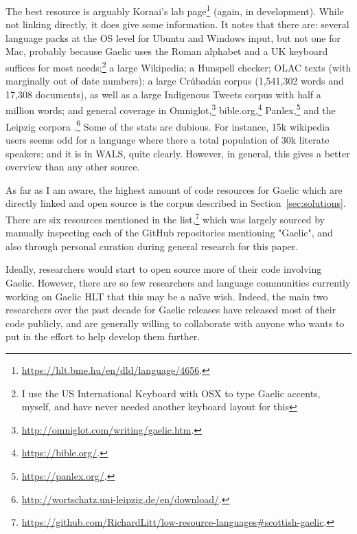 The best resource is arguably Kornai's lab page\footnote{\href{https://hlt.bme.hu/en/dld/language/4656}{https://hlt.bme.hu/en/dld/language/4656}. } (again, in development). While not linking directly, it does give some information. It notes that there are: several language packs at the OS level for Ubuntu and Windows input, but not one for Mac, probably because Gaelic uses the Roman alphabet and a UK keyboard suffices for most needs;\footnote{I use the US International Keyboard with OSX to type Gaelic accents, myself, and have never needed another keyboard layout for this} a large Wikipedia; a Hunspell checker; OLAC texts (with marginally out of date numbers); a large Cr\'ubad\'an corpus (1,541,302 words and 17,308 documents), as well as a large Indigenous Tweets corpus with half a million words; and general coverage in Omniglot,\footnote{\href{http://omniglot.com/writing/gaelic.htm}{http://omniglot.com/writing/gaelic.htm}. } bible.org,\footnote{\href{https://bible.org/}{https://bible.org/}. } Panlex,\footnote{\href{https://panlex.org/}{https://panlex.org/}. } and the Leipzig corpora \citep{goldhahn2012building}.\footnote{\href{http://wortschatz.uni-leipzig.de/en/download/}{http://wortschatz.uni-leipzig.de/en/download/}. } Some of the stats are dubious. For instance, 15k wikipedia users seems odd for a language where there a total population of 30k literate speakers; and it is in WALS, quite clearly. However, in general, this gives a better overview than any other source.

As far as I am aware, the highest amount of code resources for Gaelic which are directly linked and open source is the corpus described in Section~\ref{sec:solutions}. There are six resources mentioned in the list,\footnote{\href{https://github.com/RichardLitt/low-resource-languages\#scottish-gaelic}{https://github.com/RichardLitt/low-resource-languages\#scottish-gaelic}. } which was largely sourced by manually inspecting each of the GitHub repositories mentioning "Gaelic", and also through personal curation during general research for this paper.

Ideally, researchers would start to open source more of their code involving Gaelic. However, there are so few researchers and language communities currently working on Gaelic HLT that this may be a na\"{i}ve wish. Indeed, the main two researchers over the past decade for Gaelic releases have released most of their code publicly, and are generally willing to collaborate with anyone who wants to put in the effort to help develop them further.


